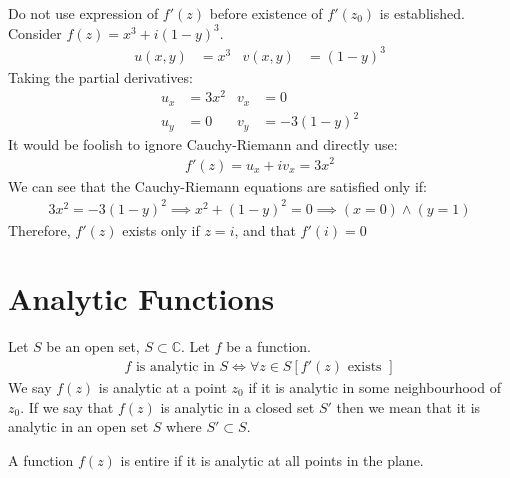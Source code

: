 \documentclass[12pt, english]{book}
\begin{document}
	\begin{example}
		Do not use expression of \(f'(z)\) before existence of \(f'(z_0)\)  is established.
		Consider \(f(z) = x^3 + i(1-y)^3\).
		\begin{align*}
			u(x,y) &= x^3	& 	v(x,y) &= (1-y)^3
		\end{align*}
		Taking the partial derivatives:
		\begin{align*}
			u_x &= 3x^2	& 	v_x &= 0\\
			u_y &= 0	&	v_y &= -3(1-y)^2
		\end{align*}
		It would be foolish to ignore Cauchy-Riemann and directly use:
		\begin{align*}
			f'(z) = u_x + iv_x = 3x^2
		\end{align*}
		We can see that the Cauchy-Riemann equations are satisfied only if:
		\begin{align*}
			3x^2 = -3(1-y)^2 \implies  x^2 + (1-y)^2 = 0 \implies (x=0)\land(y=1)
		\end{align*}
		Therefore, \(f'(z)\) exists only if \(z = i\), and that \(f'(i) = 0\)
	\end{example}
	
	\section{Analytic Functions} \label{Analytic Functions - Complex}
	
	\begin{definition}
		  
		\label{Analytic Definition - Complex}
		Let $S$ be an open set, \(S \subset \mathbb{C}\). Let \(f\) be a function.
		\begin{align*}
			f \text{ is analytic in } S \iff \forall z \in S[ f'(z) \text{ exists }]
		\end{align*}
		We say \(f(z)\) is analytic at a point \(z_0\) if it is analytic in some neighbourhood of \(z_0\). If we say that \(f(z)\) is analytic in a closed set \(S'\) then we mean that it is analytic in an open set \(S\) where \(S' \subset S\).
	\end{definition}
	
	\begin{definition}[Entire] 
		A function \(f(z)\) is entire if it is analytic at all points in the plane. 
	\end{definition}
\end{document}

